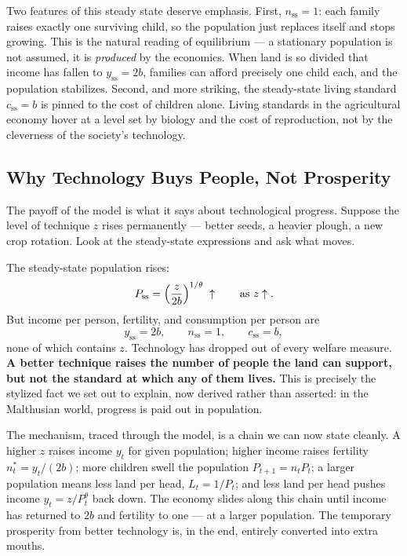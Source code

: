 Two features of this steady state deserve emphasis. First, $n_{\mathrm{ss}} = 1$: each family raises exactly one surviving child, so the population just replaces itself and stops growing. This is the natural reading of equilibrium --- a stationary population is not assumed, it is \emph{produced} by the economics. When land is so divided that income has fallen to $y_{\mathrm{ss}} = 2b$, families can afford precisely one child each, and the population stabilizes. Second, and more striking, the steady-state living standard $c_{\mathrm{ss}} = b$ is pinned to the cost of children alone. Living standards in the agricultural economy hover at a level set by biology and the cost of reproduction, not by the cleverness of the society's technology.

\subsection{Why Technology Buys People, Not Prosperity}

The payoff of the model is what it says about technological progress. Suppose the level of technique $z$ rises permanently --- better seeds, a heavier plough, a new crop rotation. Look at the steady-state expressions and ask what moves.

The steady-state population rises:
\[
P_{\mathrm{ss}} = \left(\frac{z}{2b}\right)^{1/\theta} \;\uparrow \qquad \text{as } z\uparrow.
\]
But income per person, fertility, and consumption per person are
\[
y_{\mathrm{ss}} = 2b, \qquad n_{\mathrm{ss}} = 1, \qquad c_{\mathrm{ss}} = b,
\]
none of which contains $z$. Technology has dropped out of every welfare measure. \textbf{A better technique raises the number of people the land can support, but not the standard at which any of them lives.} This is precisely the stylized fact we set out to explain, now derived rather than asserted: in the Malthusian world, progress is paid out in population.

The mechanism, traced through the model, is a chain we can now state cleanly. A higher $z$ raises income $y_t$ for given population; higher income raises fertility $n_t^{*} = y_t/(2b)$; more children swell the population $P_{t+1} = n_t P_t$; a larger population means less land per head, $L_t = 1/P_t$; and less land per head pushes income $y_t = z/P_t^{\theta}$ back down. The economy slides along this chain until income has returned to $2b$ and fertility to one --- at a larger population. The temporary prosperity from better technology is, in the end, entirely converted into extra mouths.

